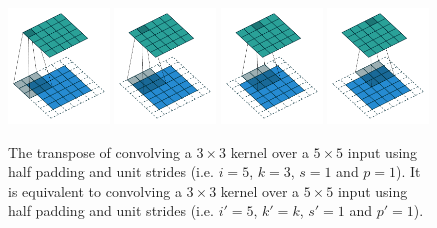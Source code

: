 \documentclass{report}
\begin{document}
\begin{figure}[p]
    \centering
    \includegraphics[width=0.24\textwidth]{pdf/same_padding_no_strides_transposed_00.pdf}
    \includegraphics[width=0.24\textwidth]{pdf/same_padding_no_strides_transposed_01.pdf}
    \includegraphics[width=0.24\textwidth]{pdf/same_padding_no_strides_transposed_02.pdf}
    \includegraphics[width=0.24\textwidth]{pdf/same_padding_no_strides_transposed_03.pdf}
    \caption{\label{fig:same_padding_no_strides_transposed} The transpose of
        convolving a $3 \times 3$ kernel over a $5 \times 5$ input using half
        padding and unit strides (i.e. $i = 5$, $k = 3$, $s = 1$ and $p = 1$).
        It is equivalent to convolving a $3 \times 3$ kernel over a $5 \times 5$
        input using half padding and unit strides (i.e. $i' = 5$, $k' = k$, $s'
        = 1$ and $p' = 1$).}
\end{figure}
\end{document}
